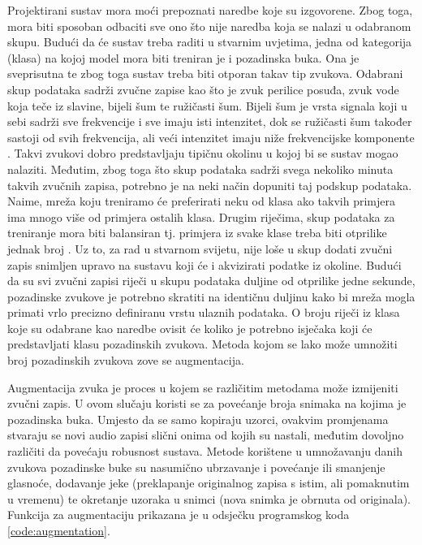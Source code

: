 Projektirani sustav mora moći prepoznati naredbe koje su izgovorene.
Zbog toga, mora biti sposoban odbaciti sve ono što nije naredba koja se
nalazi u odabranom skupu. Budući da će sustav treba raditi u stvarnim uvjetima,
jedna od kategorija (klasa)
na kojoj model mora biti treniran je i pozadinska buka. Ona je sveprisutna te 
zbog toga sustav treba biti otporan takav tip zvukova. Odabrani skup podataka
sadrži zvučne zapise kao što je zvuk perilice posuđa, zvuk vode koja teče
iz slavine, bijeli šum te ružičasti šum. Bijeli šum je vrsta
signala koji u sebi sadrži sve frekvencije i sve imaju isti intenzitet,
dok se ružičasti šum također sastoji od svih frekvencija, ali veći intenzitet
imaju niže frekvencijske komponente \cite{noise}. Takvi zvukovi dobro predstavljaju
tipičnu okolinu u kojoj bi se sustav mogao nalaziti. Međutim, zbog toga što skup
podataka sadrži
svega nekoliko minuta takvih zvučnih zapisa, potrebno je na neki način dopuniti
taj podskup podataka. Naime, mreža koju treniramo će preferirati neku od klasa
ako takvih primjera ima mnogo više od primjera ostalih klasa. Drugim riječima,
skup podataka za treniranje mora biti balansiran tj. primjera iz svake klase treba
biti otprilike jednak broj \cite{balance}. Uz to, za rad u stvarnom svijetu, nije 
loše u skup
dodati zvučni zapis snimljen upravo na sustavu koji će i akvizirati podatke iz okoline.
Budući da su svi zvučni zapisi 
riječi u skupu podataka duljine od otprilike jedne sekunde, pozadinske zvukove
je potrebno skratiti na identičnu duljinu kako bi mreža mogla primati vrlo 
precizno definiranu vrstu ulaznih podataka. O broju riječi iz klasa koje su odabrane 
kao naredbe ovisit će koliko je potrebno isječaka koji će predstavljati
klasu pozadinskih zvukova. Metoda kojom se lako može umnožiti broj pozadinskih 
zvukova zove se augmentacija.

Augmentacija zvuka je proces u kojem se različitim metodama može izmijeniti 
zvučni zapis. U ovom slučaju koristi se za povećanje broja snimaka na kojima
je pozadinska buka. Umjesto da se samo kopiraju uzorci, ovakvim promjenama stvaraju
se novi audio zapisi slični onima od kojih su nastali, međutim dovoljno različiti 
da povećaju robusnost sustava. Metode korištene u umnožavanju danih zvukova
pozadinske buke su nasumično ubrzavanje i povećanje ili smanjenje glasnoće,
dodavanje jeke (preklapanje originalnog zapisa s istim, ali pomaknutim u vremenu)
te okretanje uzoraka u snimci (nova snimka je obrnuta od originala). Funkcija
za augmentaciju prikazana je u odsječku programskog koda \ref{code:augmentation}.

